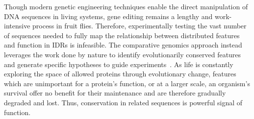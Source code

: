 Though modern genetic engineering techniques enable the direct manipulation of DNA sequences in living systems, gene editing remains a lengthy and work-intensive process in fruit flies. Therefore, experimentally testing the vast number of sequences needed to fully map the relationship between distributed features and function in IDRs is infeasible. The comparative genomics approach instead leverages the work done by nature to identify evolutionarily conserved features and generate specific hypotheses to guide experiments~\cite{Hardison2003}. As life is constantly exploring the space of allowed proteins through evolutionary change, features which are unimportant for a protein's function, or at a larger scale, an organism's survival offer no benefit for their maintenance and are therefore gradually degraded and lost. Thus, conservation in related sequences is powerful signal of function.
